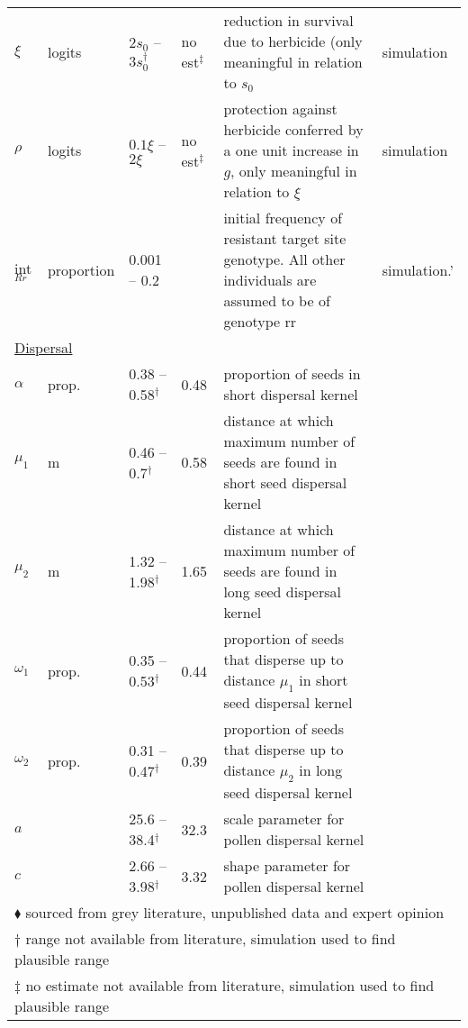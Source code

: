 \documentclass[10pt,letterpaper]{article}
\begin{document}
\begin{longtable}[h]{p{1.5cm} p{2cm} p{2.1cm} p{1.5cm} p{3.5cm} p{3cm}}
	$\xi$ & logits & $2s_0$ -- $3s_0^\dag$ & no est$^\ddag$ & reduction in survival due to herbicide (only meaningful in relation to $s_0$ & simulation\\	
	$\rho$ & logits & $0.1\xi$ -- $2\xi$ & no est$^\ddag$ & protection against herbicide conferred by a one unit increase in $g$, only meaningful in relation to $\xi$ & simulation\\
	int$_{Rr}$ & proportion & 0.001 -- 0.2 & & initial frequency of resistant target site genotype. All other individuals are assumed to be of genotype rr & simulation.'\\
	\multicolumn{6}{l}{\underline{Dispersal}}\\
	$\alpha$ & prop. & 0.38 -- 0.58$^\dag$ & 0.48 & proportion of seeds in short dispersal kernel & \cite{Colb2001}\\   
	$\mu_1$ & m & 0.46 -- 0.7$^\dag$ & 0.58 & distance at which maximum number of seeds are found in short seed dispersal kernel & \cite{Colb2001}\\
	$\mu_2$ & m & 1.32 -- 1.98$^\dag$ & 1.65 & distance at which maximum number of seeds are found in long seed dispersal kernel & \cite{Colb2001}\\
	$\omega_1$ & prop. & 0.35 -- 0.53$^\dag$ & 0.44 & proportion of seeds that disperse up to distance $\mu_1$ in short seed dispersal kernel & \cite{Colb2001}\\
	$\omega_2$ & prop. & 0.31 -- 0.47$^\dag$ & 0.39 & proportion of seeds that disperse up to distance $\mu_2$ in long seed dispersal kernel & \cite{Colb2001}\\
	$a$ & & 25.6 --38.4$^\dag$ & 32.3 & scale parameter for pollen dispersal kernel & \cite{Klei2006}\\
	$c$ & & 2.66 -- 3.98$^\dag$ & 3.32 & shape parameter for pollen dispersal kernel & \cite{Klei2006}\\
	\hline
	\multicolumn{6}{l}{$\blacklozenge$ sourced from grey literature, unpublished data and expert opinion}\\
	\multicolumn{6}{l}{$\dag$ range not available from literature, simulation used to find plausible range}\\
	\multicolumn{6}{l}{$\ddag$ no estimate not available from literature, simulation used to find plausible
	 range}
\end{longtable}
\end{document}

